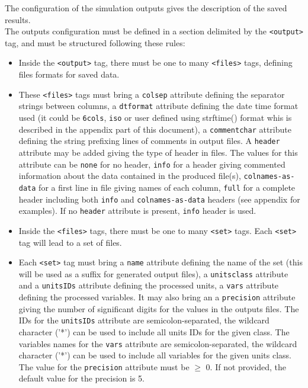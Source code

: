 The configuration of the simulation outputs gives the description of the saved
results.\\
\noindent The outputs configuration must be defined in a section delimited by
the \texttt{<output>} tag, and must be structured following these rules:
\begin{itemize}
  \item Inside the \texttt{<output>} tag, there must be one to many
  \texttt{<files>} tags, defining files formats for saved data.
  \item These \texttt{<files>} tags must bring a \texttt{colsep} attribute
  defining the separator strings between columns, a \texttt{dtformat} attribute
  defining the date time format used (it could be \texttt{6cols}, \texttt{iso}
  or user defined using strftime() format whis is described in the appendix
  part of this document), a \texttt{commentchar} attribute defining the string
  prefixing lines of comments in output files. A \texttt{header} attribute may
  be added giving the type of header in files. The values for this attribute can
  be \texttt{none} for no header, \texttt{info} for a header giving commented information
  about the data contained in the produced file(s), \texttt{colnames-as-data} 
  for a first line in file giving names of each column, \texttt{full} for 
  a complete header including both \texttt{info} and \texttt{colnames-as-data} headers 
  (see appendix for examples). If no \texttt{header} attribute is present,
  \texttt{info} header is used.
  \item Inside the \texttt{<files>} tags, there must be one to many
  \texttt{<set>} tags. Each \texttt{<set>} tag will lead to a set of files.
  \item Each \texttt{<set>} tag must bring a \texttt{name} attribute defining
  the name of the set (this will be used as a suffix for generated output
  files), a \texttt{unitsclass} attribute and a \texttt{unitsIDs} attribute
  defining the processed units, a \texttt{vars} attribute defining the
  processed variables. It may also bring an a \texttt{precision} attribute
  giving the number of significant digits for the values in the outputs files.
  The IDs for the \texttt{unitsIDs} attribute are semicolon-separated, the
  wildcard character ('*') can be used to include all units IDs for the given
  class. The variables names for the \texttt{vars} attribute are
  semicolon-separated, the wildcard character ('*') can be used to include all
  variables for the given units class. The value for the \texttt{precision} attribute
  must be $\geq$ 0. If not provided, the default value for the precision is 5.
\end{itemize}


